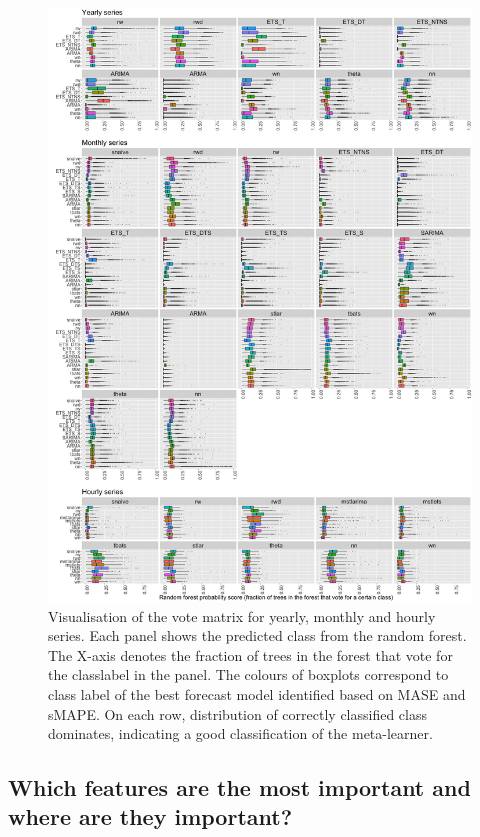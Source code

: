 \documentclass[11pt,a4paper,]{article}
\begin{document}
\begin{figure}[h]

{\centering \includegraphics[width=\textwidth]{figure/yearlyoob-1} 

}

\caption{Visualisation of the vote matrix for yearly, monthly and hourly series. Each panel shows the predicted class from the random forest. The X-axis denotes the fraction of trees in the forest that vote for the classlabel in the panel. The colours of boxplots correspond to class label of the best forecast model identified based on MASE and sMAPE. On each row, distribution of correctly classified class dominates, indicating a good classification of the meta-learner.}\label{fig:yearlyoob}
\end{figure}

\clearpage

\hypertarget{which-features-are-the-most-important-and-where-are-they-important}{%
\subsection{Which features are the most important and where are they important?}\label{which-features-are-the-most-important-and-where-are-they-important}}
\end{document}
